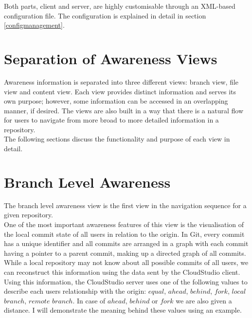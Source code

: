 Both parts, client and server, are highly customisable through an XML-based configuration file. The configuration is explained in detail in section \ref{configmanagement}.






\section{Separation of Awareness Views}

Awareness information is separated into three different views: branch view, file view and content view. Each view provides distinct information and serves its own purpose; however, some information can be accessed in an overlapping manner, if desired. The views are also built in a way that there is a natural flow for users to navigate from more broad to more detailed information in a repository. \\

The following sections discuss the functionality and purpose of each view in detail.







\section{Branch Level Awareness}




The branch level awareness view is the first view in the navigation sequence for a given repository. \\

One of the most important awareness features of this view is the visualisation of the local commit state of all users in relation to the origin. In Git, every commit has a unique identifier and all commits are arranged in a graph with each commit having a pointer to a parent commit, making up a directed graph of all commits. While a local repository may not know about all possible commits of all users, we can reconstruct this information using the data sent by the CloudStudio client. \\

Using this information, the CloudStudio server uses one of the following values to describe each users relationship with the origin: $equal$, $ahead$, $behind$, $fork$, $local$ $branch$, $remote$ $branch$. In case of $ahead$, $behind$ or $fork$ we are also given a distance. I will demonstrate the meaning behind these values using an example. \\

